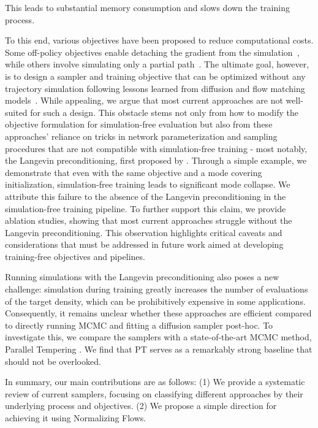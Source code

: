 This leads to substantial memory consumption and slows down the training process.
\par
To this end, various objectives have been proposed to reduce computational costs. 
Some off-policy objectives enable detaching the gradient from the simulation~\citep{richterimproved}, while others involve simulating only a partial path~\citep{zhangdiffusion}.
The ultimate goal, however, is to design a sampler and training objective that can be optimized without any trajectory simulation following lessons learned from diffusion and flow matching models~\citep{ho2020denoising,songscore,lipmanflow}.
While appealing, we argue that most current approaches are not well-suited for such a design. 
This obstacle stems not only from how to modify the objective formulation for simulation-free evaluation but also from these approaches' reliance on tricks in network parameterization and sampling procedures that are not compatible with simulation-free training - most notably, the Langevin preconditioning, first proposed by \citet{zhangpath}. 
Through a simple example, we demonstrate that even with the same objective and a mode covering initialization, simulation-free training leads to significant mode collapse. 
We attribute this failure to the absence of the Langevin preconditioning in the simulation-free training pipeline.
To further support this claim, we provide ablation studies, showing that most current approaches struggle without the Langevin preconditioning. 
This observation highlights critical caveats and considerations that must be addressed in future work aimed at developing training-free objectives and pipelines.
\par
Running simulations with the Langevin preconditioning also poses a new challenge: 
simulation during training greatly increases the number of evaluations of the target density, which can be prohibitively expensive in some applications.
Consequently, it remains unclear whether these approaches are efficient compared to directly running MCMC and fitting a diffusion sampler post-hoc.
To investigate this, we compare the samplers with a state-of-the-art MCMC method, Parallel Tempering \citep[PT, ][]{PhysRevLett.57.2607,earl2005parallel}.
We find that PT serves as a remarkably strong baseline that should not be overlooked. 
\par
In summary, our main contributions are as follows:
(1) We provide a systematic review of current samplers, focusing on classifying different approaches by their underlying process and objectives. 
(2) We propose a simple direction for achieving it using Normalizing Flows. 
